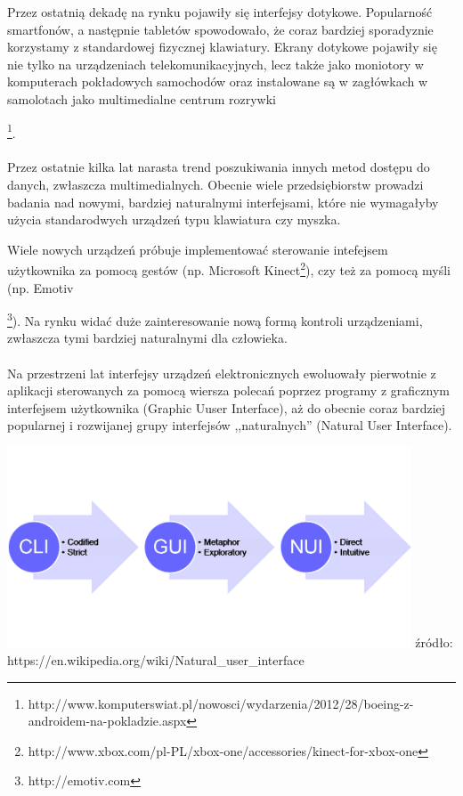\documentclass[12pt]{article}
\begin{document}
Przez ostatnią dekadę na rynku pojawiły się interfejsy dotykowe. Popularność smartfonów, a następnie tabletów spowodowało, że coraz bardziej sporadyznie korzystamy z standardowej fizycznej klawiatury.
Ekrany dotykowe pojawiły się nie tylko na urządzeniach telekomunikacyjnych, lecz także jako moniotory w komputerach pokładowych samochodów oraz instalowane są w zagłówkach w samolotach jako multimedialne centrum rozrywki {\footnote{http://www.komputerswiat.pl/nowosci/wydarzenia/2012/28/boeing-z-androidem-na-pokladzie.aspx}.
\paragraph{}
Przez ostatnie kilka lat narasta trend poszukiwania innych metod dostępu do danych, zwłaszcza multimedialnych. Obecnie wiele przedsiębiorstw prowadzi badania nad nowymi, bardziej naturalnymi interfejsami, które nie wymagałyby użycia standarodwych urządzeń typu klawiatura czy myszka.

Wiele nowych urządzeń próbuje implementować sterowanie intefejsem użytkownika za pomocą gestów (np. Microsoft Kinect\footnote{http://www.xbox.com/pl-PL/xbox-one/accessories/kinect-for-xbox-one}), czy też za pomocą myśli (np. Emotiv{\footnote{http://emotiv.com}). Na rynku widać duże zainteresowanie nową formą kontroli urządzeniami, zwłaszcza tymi bardziej naturalnymi dla człowieka.

\paragraph{}
Na przestrzeni lat interfejsy urządzeń elektronicznych ewoluowały pierwotnie z aplikacji sterowanych za pomocą wiersza polecań poprzez programy z graficznym interfejsem użytkownika (Graphic Uuser Interface), aż do obecnie coraz bardziej popularnej i rozwijanej grupy interfejsów ,,naturalnych'' (Natural User Interface).
\begin{center}
\includegraphics[width=0.9\textwidth]{images/nui.png}
\small {źródło: https://en.wikipedia.org/wiki/Natural\_user\_interface }
\end{center}

}}
\end{document}
